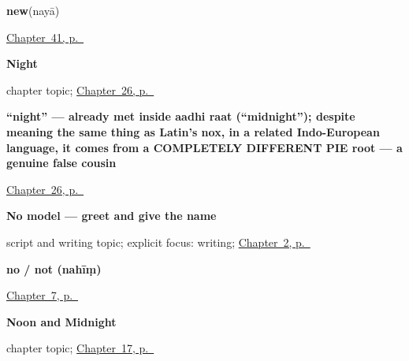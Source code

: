 \noindent\begin{minipage}[t]{\linewidth}
\raggedright
\textbf{new}\enspace\emph{}\enspace(nayā)\par
\footnotesize \hyperref[ch:hi-describing-things]{Chapter~41, p.~\pageref*{ch:hi-describing-things}}
\end{minipage}\par\smallskip

\noindent\begin{minipage}[t]{\linewidth}
\raggedright
\textbf{Night}\par
\footnotesize chapter topic; \hyperref[ch:hi-night]{Chapter~26, p.~\pageref*{ch:hi-night}}
\end{minipage}\par\smallskip

\noindent\begin{minipage}[t]{\linewidth}
\raggedright
\textbf{\textquotedblleft{}night\textquotedblright{} — already met inside aadhi raat (\textquotedblleft{}midnight\textquotedblright{}); despite meaning the same thing as Latin's nox, in a related Indo-European language, it comes from a COMPLETELY DIFFERENT PIE root — a genuine false cousin}\enspace\emph{}\par
\footnotesize \hyperref[ch:hi-night]{Chapter~26, p.~\pageref*{ch:hi-night}}
\end{minipage}\par\smallskip

\noindent\begin{minipage}[t]{\linewidth}
\raggedright
\textbf{No model — greet and give the name}\par
\footnotesize script and writing topic; explicit focus: writing; \hyperref[ch:introductions]{Chapter~2, p.~\pageref*{ch:introductions}}
\end{minipage}\par\smallskip

\noindent\begin{minipage}[t]{\linewidth}
\raggedright
\textbf{no / not (nahīṃ)}\enspace\emph{}\par
\footnotesize \hyperref[ch:hi-yes-and-no]{Chapter~7, p.~\pageref*{ch:hi-yes-and-no}}
\end{minipage}\par\smallskip

\noindent\begin{minipage}[t]{\linewidth}
\raggedright
\textbf{Noon and Midnight}\par
\footnotesize chapter topic; \hyperref[ch:hi-noon-and-midnight]{Chapter~17, p.~\pageref*{ch:hi-noon-and-midnight}}
\end{minipage}\par\smallskip

